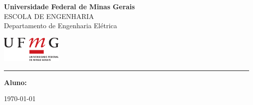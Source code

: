 \thispagestyle{empty}

\noindent
\begin{minipage}{0.8\linewidth}
  {\Large\bf Universidade Federal de Minas Gerais}\\
  {\small ESCOLA DE ENGENHARIA}\\
  {\sc Departamento de Engenharia Elétrica}
\end{minipage} 
\hfill 
\begin{minipage}{3cm}
  \includegraphics[width=3cm]{res/ufmg_ext.pdf}
\end{minipage}

\vspace{1mm}

\noindent
\hrule

\vspace{2.0cm}

\vfill

\begin{center}
  \Large \textsc{\textbf{\titleLa}}
\end{center}

\vfill

\begin{center}
  \Large\textsc{\textbf{\titleLb}}
\end{center}

\vfill

\begin{flushright}
    \begin{minipage}{12.0cm}
        {\bf Aluno:} \nomeAluno     
    \end{minipage}
\end{flushright}

\vfill

\begin{center}
  \today
\end{center}

\vfill

\newpage
